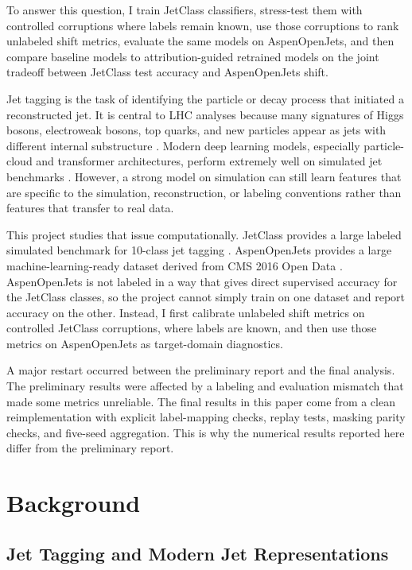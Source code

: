\documentclass[11pt]{article}
\begin{document}
To answer this question, I train JetClass classifiers, stress-test them with controlled corruptions where labels remain known, use those corruptions to rank unlabeled shift metrics, evaluate the same models on AspenOpenJets, and then compare baseline models to attribution-guided retrained models on the joint tradeoff between JetClass test accuracy and AspenOpenJets shift.

Jet tagging is the task of identifying the particle or decay process that initiated a reconstructed jet. It is central to LHC analyses because many signatures of Higgs bosons, electroweak bosons, top quarks, and new particles appear as jets with different internal substructure \cite{larkoski2017jet,kogler2019jet}. Modern deep learning models, especially particle-cloud and transformer architectures, perform extremely well on simulated jet benchmarks \cite{qu2022particle}. However, a strong model on simulation can still learn features that are specific to the simulation, reconstruction, or labeling conventions rather than features that transfer to real data.

This project studies that issue computationally. JetClass provides a large labeled simulated benchmark for 10-class jet tagging \cite{qu2022particle}. AspenOpenJets provides a large machine-learning-ready dataset derived from CMS 2016 Open Data \cite{amram2025aspen}. AspenOpenJets is not labeled in a way that gives direct supervised accuracy for the JetClass classes, so the project cannot simply train on one dataset and report accuracy on the other. Instead, I first calibrate unlabeled shift metrics on controlled JetClass corruptions, where labels are known, and then use those metrics on AspenOpenJets as target-domain diagnostics.

A major restart occurred between the preliminary report and the final analysis. The preliminary results were affected by a labeling and evaluation mismatch that made some metrics unreliable. The final results in this paper come from a clean reimplementation with explicit label-mapping checks, replay tests, masking parity checks, and five-seed aggregation. This is why the numerical results reported here differ from the preliminary report.

\section{Background}

\subsection{Jet Tagging and Modern Jet Representations}
\end{document}
